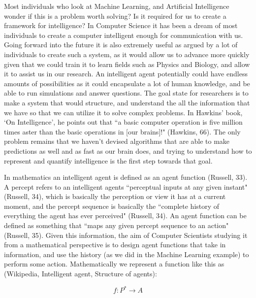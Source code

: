 \documentclass[11pt, oneside]{article}
\begin{document}
\par Most individuals who look at Machine Learning, and Artificial Intelligence wonder if this is a problem worth solving? Is it required for us to create a framework for intelligence? In Computer Science it has been a dream of most individuals to create a computer intelligent enough for communication with us. Going forward into the future it is also extremely useful as argued by a lot of individuals to create such a system, as it would allow us to advance more quickly given that we could train it to learn fields such as Physics and Biology, and allow it to assist us in our research. An intelligent agent potentially could have endless amounts of possibilities as it could encapsulate a lot of human knowledge, and be able to run simulations and answer questions. The goal state for researchers is to make a system that would structure, and understand the all the information that we have so that we can utilize it to solve complex problems. In Hawkins' book, `On Intelligence', he points out that ``a basic computer operation is five million times aster than the basic operations in [our brains]!" (Hawkins, 66). The only problem remains that we haven't devised algorithms that are able to make predictions as well and as fast as our brain does, and trying to understand how to represent and quantify intelligence is the first step towards that goal. 


\par In mathematics an intelligent agent is defined as an agent function (Russell, 33). A percept refers to an intelligent agents ``perceptual inputs at any given instant" (Russell, 34), which is basically the perception or view it has at a current moment, and the percept sequence is basically the ``complete history of everything the agent has ever perceived" (Russell, 34). An agent function can be defined as something that ``maps any given percept sequence to an action" (Russell, 35). Given this information, the aim of Computer Scientists studying it from a mathematical perspective is to design agent functions that take in information, and use the history (as we did in the Machine Learning example) to perform some action. Mathematically we represent a function like this as (Wikipedia, Intelligent agent, Structure of agents):

\begin{equation} \label{eu_eqn}
f\colon P^* \to A
\end{equation}
\end{document}
